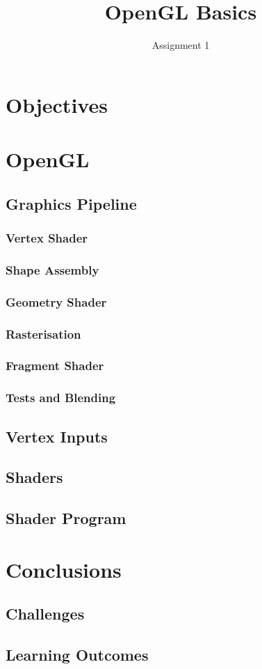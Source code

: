 \documentclass[a4paper, 12pt]{scrartcl}
\title{OpenGL Basics}
\subtitle{Assignment 1}
\date{}
\author{}
\begin{document}
\maketitle

\section{Objectives}

\section{OpenGL}
\subsection{Graphics Pipeline}
\subsubsection{Vertex Shader}

\subsubsection{Shape Assembly}

\subsubsection{Geometry Shader}

\subsubsection{Rasterisation}

\subsubsection{Fragment Shader}

\subsubsection{Tests and Blending}

\subsection{Vertex Inputs}

\subsection{Shaders}

\subsection{Shader Program}

\section{Conclusions}
\subsection{Challenges}

\subsection{Learning Outcomes}
\end{document}
